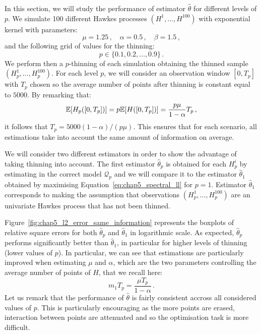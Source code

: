     In this section, we will study the performance of estimator $\hat\theta$ for different levels of $p$.
    We simulate 100 different Hawkes processes $(H^1,\ldots, H^{100})$ with exponential kernel with parameters:
    \[\mu = 1.25\,,\quad \alpha = 0.5\,,\quad \beta = 1.5\,,\]
    and the following grid of values for the thinning:
    \[p\in\{0.1, 0.2, \ldots, 0.9\}\,.\]
    We perform then a $p$-thinning of each simulation obtaining the thinned sample $(H_p^1, \ldots, H_p^{100})$.
    For each level $p$, 
    we will consider an observation window $[0,T_p]$ with $T_p$ chosen so the average number of points after thinning is constant equal to $5000$.
    By remarking that:
    \[{\mathbb E}[H_p([0, T_p])] = p{\mathbb E}[H([0,T_p])] = \frac{ p \mu }{1-\alpha} T_p\,,\]
    it follows that $T_p = 5000 (1-\alpha) / (p \mu)$.
    This ensures that for each scenario, all estimations take into account the same amount of information on average.

    We will consider two different estimators in order to show the advantage of taking thinning into account.
    The first estimator $\hat \theta_p$ is obtained for each $H_p^i$ by estimating in the correct model $\mathcal{Q}_p$ 
    and we will compare it to the estimator $\hat \theta_1$ obtained by maximising Equation~\eqref{eq:chap5_spectral_ll}
    for $p=1$.
    Estimator $\hat \theta_1$ corresponds to making the assumption that observations $(H_p^1, \ldots, H_p^{100})$
    are an univariate Hawkes process that has not been thinned.

    Figure~\ref{fig:chap5_l2_error_same_information} represents the boxplots of relative square errors for both $\hat \theta_p$ and $\hat \theta_1$ in logarithmic scale.
    As expected, $\hat \theta_p$ performs significantly better than $\hat \theta_1$, 
    in particular for higher levels of thinning (lower values of $p$).
    In particular, we can see that estimations are particularly improved when estimating $\mu$ and $\alpha$,
    which are the two parameters controlling the average number of points of $H$, that we recall here:
    \[m_1 T_p = \frac{\mu T_p}{1-\alpha}\,.\]
    Let us remark that the performance of $\hat \theta$ is fairly consistent accross all considered values of $p$.
    This is particularly encouraging as the more points are erased, 
    interaction between points are attenuated and so the optimisation task is more difficult.

